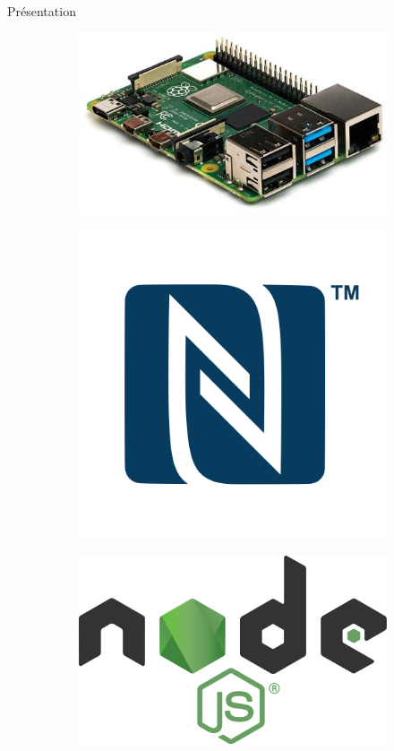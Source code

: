 \documentclass[aspectratio=169]{beamer}
\begin{document}
\begin{frame}{Présentation}
    \begin{figure}
        \begin{subfigure}{.2\textwidth}
            \centering
            \includegraphics[width=.8\linewidth]{../assets/raspi.jpeg}
        \end{subfigure}
        \begin{subfigure}{.2\textwidth}
            \centering
            \includegraphics[width=.8\linewidth]{../assets/nfc.png}
        \end{subfigure}
        \begin{subfigure}{.2\textwidth}
            \centering
            \includegraphics[width=.8\linewidth]{../assets/nodejs.png}
        \end{subfigure}
    \end{figure}
\end{frame}
\end{document}
